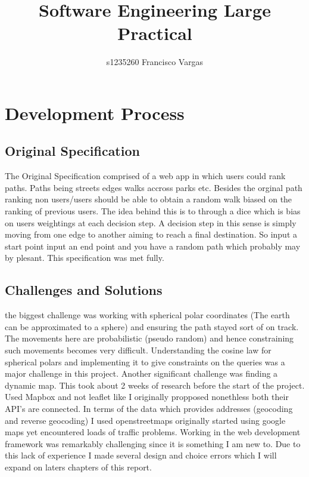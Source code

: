 \documentclass[11pt]{article}
\begin{document}
 


\title{Software Engineering Large Practical}
\author{s1235260 Francisco Vargas}
\maketitle

\section{Development Process}
\subsection{Original Specification}
The Original Specification comprised of a web app in which users could rank paths. Paths being streets edges walks accross parks etc. Besides the orginal path ranking non users/users should be able to obtain a random walk biased on the ranking of previous users. The idea behind this is to through a dice which is bias on users weightings at each decision step. A decision step in this sense is simply moving from one edge to another aiming to reach a final destination. So input a start point input an end point and you have a random path which probably may 
by plesant. This specification was met fully.
\subsection{Challenges and Solutions} 
the biggest challenge was working with spherical polar coordinates (The earth can be approximated
to a sphere) and ensuring the path stayed sort of on track. The movements here are probabilistic (pseudo random) and hence constraining 
such movements becomes very difficult. Understanding the cosine law for spherical polars and implementing it to give constraints on the queries was a major challenge in this project.
\newline
\newline
Another significant challenge was finding a dynamic map. This took about 2 weeks of research before the start of the project. Used Mapbox and not leaflet like I originally propposed nonethless both their API's are connected. In terms of the data which provides addresses (geocoding and reverse geocoding) I used openstreetmaps originally started using google maps yet encountered loads of traffic problems.
\newline
\newline
Working in the web development framework was remarkably challenging since it is something I am new to. Due to this lack of experience I made several design and choice errors which I will expand on laters chapters of this report.
\end{document}
